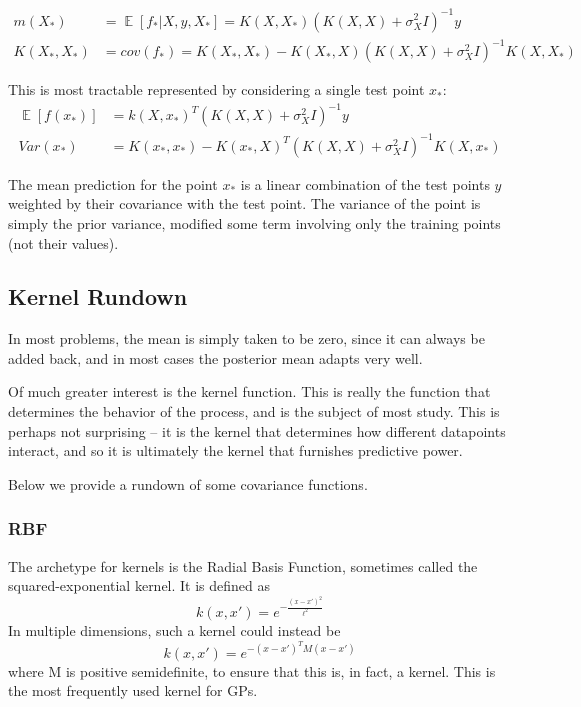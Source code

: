\documentclass[10pt]{article}
\DeclareMathOperator{\Ex}{\mathbb{E}}%
\theoremstyle{definition}
\begin{document}
\begin{align}
  m(X_{*})  &= \Ex \left[ f_{*} | X,y,X_{*}\right]  = K(X,X_{*}) \left( K(X,X) + \sigma_X^2 I \right)^{-1} y \\ 
  K(X_{*}, X_{*})  &= cov(f_{*}) = K(X_{*},X_{*}) - K(X_{*},X)\left( K(X,X) +\sigma_X^2 I \right)^{-1} K(X,X_{*})
\end{align}

This is most tractable represented by considering a single test point $x_{*}$:
\begin{align}
  \label{eq:single-point-pred}
  \Ex\left[f(x_{*})\right] &=  k(X, x_{*})^{T} \left( K(X,X)  + \sigma_X^2 I \right)^{-1} y \\
  Var(x_{*})  &=  K(x_{*},x_{*}) - K(x_{*},X)^{T}\left( K(X,X) +\sigma_X^2 I \right)^{-1} K(X,x_{*})
\end{align}

The mean prediction for the point $x_{*}$ is a linear combination of the test points $y$ weighted by their covariance with the test point. The variance of the point is simply the prior variance, modified some term involving only the training points (not their values). 

\subsection{Kernel Rundown}

In most problems, the mean is simply taken to be zero, since it can always be added back, and in most cases the posterior mean adapts very well.

Of much greater interest is the kernel function. This is really the function that determines the behavior of the process, and is the subject of most study.
This is perhaps not surprising -- it is the kernel that determines how different datapoints interact, and so it is ultimately the kernel that furnishes predictive power.

Below we provide a rundown of some covariance functions.

\subsubsection{RBF}
The archetype for kernels is the Radial Basis Function, sometimes called the squared-exponential kernel. It is defined as
\begin{equation}
  \label{}
  k(x,x') = e^{-\frac{(x-x')^{2}}{\ell^{2}}}
\end{equation}
In multiple dimensions, such a kernel could instead be 
\begin{equation}
  k(x,x') = e^{-(x-x')^{T} M (x-x')}
\end{equation}
where M is positive semidefinite, to ensure that this is, in fact, a kernel.
This is the most frequently used kernel for GPs.
\end{document}
